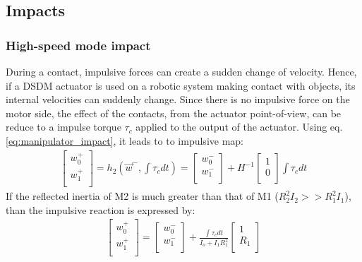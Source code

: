 
\subsection{Impacts}
\label{sec:model_impact}

\subsubsection{High-speed mode impact}

During a contact, impulsive forces can create a sudden change of velocity. Hence, if a DSDM actuator is used on a robotic system making contact with objects, its internal velocities can suddenly change. Since there is no impulsive force on the motor side, the effect of the contacts, from the actuator point-of-view, can be reduce to a impulse torque $\tau_c$ applied to the output of the actuator. Using eq. \eqref{eq:manipulator_impact}, it leads to to impulsive map:
%
\begin{align}
\left[
\begin{array}{c}
w_0^+ \\
w_1^+ \\
\end{array}
\right] = h_2( \vec{w}^- , \int \tau_c dt ) = 
\left[
\begin{array}{c}
w_0^- \\
w_1^- \\
\end{array}
\right] +
H^{-1} \left[
\begin{array}{c}
1 \\
0 \\
\end{array}
\right] \int{\tau_c dt}
\end{align}
%
If the reflected inertia of M2 is much greater than that of M1 ($R_2^2 I_2 >> R_1^2 I_1 $), than the impulsive reaction is expressed by:
%
\begin{align}
\left[
\begin{array}{c}
w_0^+ \\
w_1^+ \\
\end{array}
\right] = 
\left[
\begin{array}{c}
w_0^- \\
w_1^- \\
\end{array}
\right] +
\frac{ \int{\tau_c dt} }{ I_o + I_1 R_1^2} 
\left[
\begin{array}{c}
1 \\
R_1 \\
\end{array}
\right] 
\end{align}
